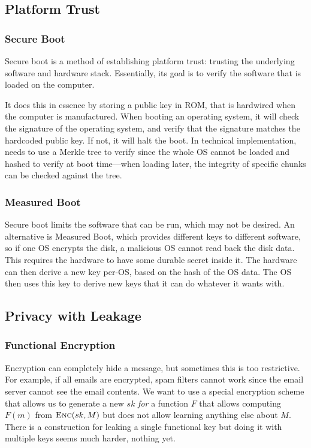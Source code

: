 \documentclass{article}
\begin{document}
\begin{multicols*}{2}
\subsection{Platform Trust}
\subsubsection{Secure Boot}
Secure boot is a method of establishing platform trust: trusting the underlying software and hardware stack. Essentially, its goal is to verify the software that is loaded on the computer. 

It does this in essence by storing a public key in ROM, that is hardwired when the computer is manufactured. When booting an operating system, it will check the signature of the operating system, and verify that the signature matches the hardcoded public key. If not, it will halt the boot. In technical implementation, needs to use a Merkle tree to verify since the whole OS cannot be loaded and hashed to verify at boot time---when loading later, the integrity of specific chunks can be checked against the tree.

\subsubsection{Measured Boot} 
Secure boot limits the software that can be run, which may not be desired. An alternative is Measured Boot, which provides different keys to different software, so if one OS encrypts the disk, a malicious OS cannot read back the disk data. This requires the hardware to have some durable secret inside it. The hardware can then derive a new key per-OS, based on the hash of the OS data. The OS then uses this key to derive new keys that it can do whatever it wants with. 

\subsection{Privacy with Leakage}
\subsubsection{Functional Encryption}
Encryption can completely hide a message, but sometimes this is too restrictive. For example, if all emails are encrypted, spam filters cannot work since the email server cannot see the email contents. We want to use a special encryption scheme that allows us to generate a new $sk$ \textit{for} a function $F$ that allows computing $F(m)$ from $\textsc{Enc}(sk, M)$ but does not allow learning anything else about $M$. There is a construction for leaking a single functional key but doing it with multiple keys seems much harder, nothing yet.


\end{multicols*}
\end{document}
